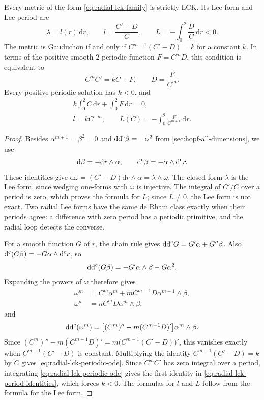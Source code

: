 \begin{lemma}\label{lem:radial-lck-gauduchon-equation}
Every metric of the form \eqref{eq:radial-lck-family} is strictly LCK. Its Lee form and Lee period are
\[
 \lambda=l(r)\,\mathrm dr,\qquad
 l=\frac{C'-D}{C},\qquad
 L=-\int_0^2\frac{D}{C}\,\mathrm dr<0.
\]
The metric is Gauduchon if and only if $C^{m-1}(C'-D)=k$ for a constant $k$. In terms of the positive smooth $2$-periodic function $F=C^mD$, this condition is equivalent to
\begin{equation}\label{eq:radial-lck-periodic-ode}
 C^mC'=kC+F,\qquad D=\frac{F}{C^m}.
\end{equation}
Every positive periodic solution has $k<0$, and
\begin{equation}\label{eq:radial-lck-period-identities}
 \begin{gathered}
 k\int_0^2C\,\mathrm dr+\int_0^2F\,\mathrm dr=0,
 \\
 l=kC^{-m},\qquad
 L(C)=-\int_0^2\frac{F}{C^{m+1}}\,\mathrm dr.
 \end{gathered}
\end{equation}
\end{lemma}
\begin{proof}
Besides $\alpha^{m+1}=\beta^2=0$ and $\mathrm{dd}^{\mathrm{c}}\beta=-\alpha^2$ from \cref{sec:hopf-all-dimensions}, we use
\[
 \mathrm d\beta=-\mathrm dr\wedge\alpha,\qquad
 \mathrm d^{\mathrm c}\beta=-\alpha\wedge\mathrm d^{\mathrm c} r.
\]
These identities give $\mathrm d\omega=(C'-D)\mathrm dr\wedge\alpha=\lambda\wedge\omega$. The closed form $\lambda$ is the Lee form, since wedging one-forms with $\omega$ is injective. The integral of $C'/C$ over a period is zero, which proves the formula for $L$; since $L\neq0$, the Lee form is not exact. Two radial Lee forms have the same de Rham class exactly when their periods agree: a difference with zero period has a periodic primitive, and the radial loop detects the converse.

For a smooth function $G$ of $r$, the chain rule gives $\mathrm{dd}^{\mathrm{c}} G=G'\alpha+G''\beta$. Also $\mathrm d^{\mathrm c}(G\beta)=-G\alpha\wedge\mathrm d^{\mathrm c} r$, so
\[
 \mathrm{dd}^{\mathrm{c}}(G\beta)=-G'\alpha\wedge\beta-G\alpha^2.
\]
Expanding the powers of $\omega$ therefore gives
\[
 \begin{aligned}
 \omega^m&=C^m\alpha^m+mC^{m-1}D\alpha^{m-1}\wedge\beta,\\
 \omega^n&=nC^mD\alpha^m\wedge\beta,
 \end{aligned}
\]
and
\[
 \mathrm{dd}^{\mathrm{c}}(\omega^m)=
 \bigl[(C^m)''-m(C^{m-1}D)'\bigr]\alpha^m\wedge\beta.
\]
Since $(C^m)''-m(C^{m-1}D)'=m\bigl(C^{m-1}(C'-D)\bigr)'$, this vanishes exactly when $C^{m-1}(C'-D)$ is constant. Multiplying the identity $C^{m-1}(C'-D)=k$ by $C$ gives \eqref{eq:radial-lck-periodic-ode}. Since $C^mC'$ has zero integral over a period, integrating \eqref{eq:radial-lck-periodic-ode} gives the first identity in \eqref{eq:radial-lck-period-identities}, which forces $k<0$. The formulas for $l$ and $L$ follow from the formula for the Lee form.
\end{proof}

